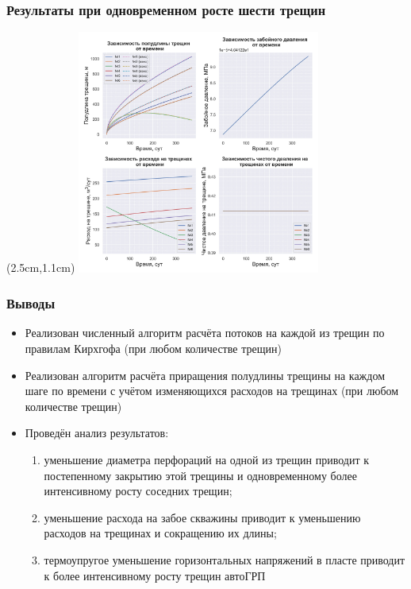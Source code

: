 \documentclass{beamer}
\begin{document}
\begin{frame}
\frametitle{Результаты при одновременном росте шести трещин}

\begin{textblock*}{8cm}(2.5cm,1.1cm)
\includegraphics[width=8cm]{myimage13.jpg}
\end{textblock*}

\end{frame}


\begin{frame}
\frametitle{Выводы}

\small

\begin{itemize}
	\item Реализован численный алгоритм расчёта потоков на каждой из трещин по правилам Кирхгофа (при любом количестве трещин)
	\item Реализован алгоритм расчёта приращения полудлины трещины на каждом шаге по времени с учётом изменяющихся расходов на трещинах (при любом количестве трещин)
	\item Проведён анализ результатов:
	\begin{enumerate}[--]
	\item уменьшение диаметра перфораций на одной из трещин приводит к постепенному закрытию этой трещины и одновременному более интенсивному росту соседних трещин;
	\item уменьшение расхода на забое скважины приводит к уменьшению расходов на трещинах и сокращению их длины;
	\item термоупругое уменьшение горизонтальных напряжений в пласте приводит к более интенсивному росту трещин автоГРП
	\end{enumerate}
\end{itemize}

\normalsize

\end{frame}
\end{document}
